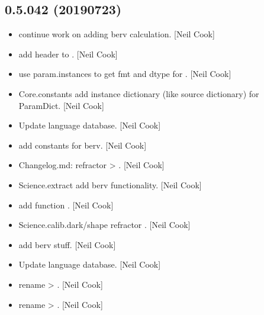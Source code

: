 \documentclass[a4paper,10pt,english]{report}
\begin{document}
\subsection{0.5.042 (2019\sphinxhyphen{}07\sphinxhyphen{}23)}
\label{\detokenize{misc/changelog:id118}}\begin{itemize}
\item {} 
 \sphinxhyphen{} continue work on adding berv calculation.
{[}Neil Cook{]}

\item {} 
 \sphinxhyphen{} add header to . {[}Neil Cook{]}

\item {} 
 \sphinxhyphen{} use param.instances to get fmt and dtype for .
{[}Neil Cook{]}

\item {} 
Core.constants \sphinxhyphen{} add instance dictionary (like source dictionary) for
ParamDict. {[}Neil Cook{]}

\item {} 
Update language database. {[}Neil Cook{]}

\item {} 
 \sphinxhyphen{} add constants for berv. {[}Neil Cook{]}

\item {} 
Changelog.md: refractor  \textendash{}\textgreater{} . {[}Neil Cook{]}

\item {} 
Science.extract \sphinxhyphen{} add berv functionality. {[}Neil Cook{]}

\item {} 
 \sphinxhyphen{} add function . {[}Neil Cook{]}

\item {} 
Science.calib.dark/shape \sphinxhyphen{} refractor .
{[}Neil Cook{]}

\item {} 
 \sphinxhyphen{} add berv stuff. {[}Neil Cook{]}

\item {} 
Update language database. {[}Neil Cook{]}

\item {} 
 \sphinxhyphen{} rename  \textendash{}\textgreater{} . {[}Neil Cook{]}

\item {} 
 \sphinxhyphen{} rename  \textendash{}\textgreater{} . {[}Neil
Cook{]}

\end{itemize}
\end{document}
